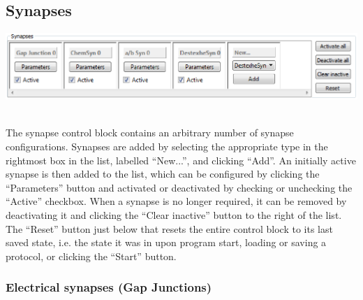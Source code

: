 \documentclass{article}
\begin{document}
\subsection{Synapses}

\noindent
\parbox{\textwidth}{
	\includegraphics[scale=0.5]{synapseBlock}
} \\[0.2cm]

The synapse control block contains an arbitrary number of synapse configurations.
Synapses are added by selecting the appropriate type in the rightmost box in the
list, labelled ``New...'', and clicking ``Add''. An initially active synapse is
then added to the list, which can be configured by clicking the ``Parameters'' button and
activated or deactivated by checking or unchecking the ``Active'' checkbox. When a synapse is no
longer required, it can be removed by deactivating it and clicking the
``Clear inactive'' button to the right of the list. The ``Reset'' button just below that
resets the entire control block to its last saved state, i.e. the state it was in upon
program start, loading or saving a protocol, or clicking the ``Start'' button.

\subsubsection{Electrical synapses (Gap Junctions)}
\end{document}
